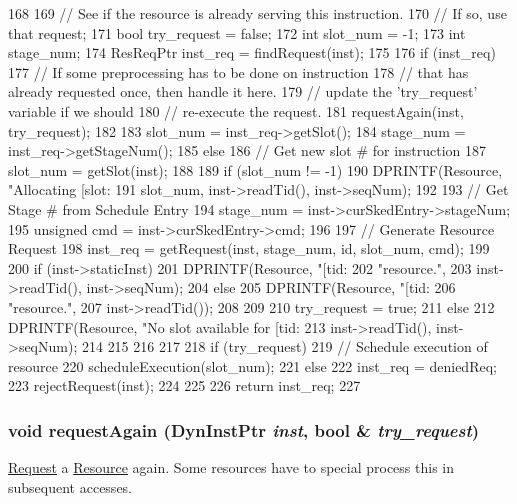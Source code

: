 \begin{DoxyCode}
168 {
169     // See if the resource is already serving this instruction.
170     // If so, use that request;
171     bool try_request = false;
172     int slot_num = -1;
173     int stage_num;
174     ResReqPtr inst_req = findRequest(inst);
175 
176     if (inst_req) {
177         // If some preprocessing has to be done on instruction
178         // that has already requested once, then handle it here.
179         // update the 'try_request' variable if we should
180         // re-execute the request.
181         requestAgain(inst, try_request);
182 
183         slot_num = inst_req->getSlot();
184         stage_num = inst_req->getStageNum();
185     } else {
186         // Get new slot # for instruction
187         slot_num = getSlot(inst);
188 
189         if (slot_num != -1) {
190             DPRINTF(Resource, "Allocating [slot:%
191                     slot_num, inst->readTid(), inst->seqNum);
192 
193             // Get Stage # from Schedule Entry
194             stage_num = inst->curSkedEntry->stageNum;
195             unsigned cmd = inst->curSkedEntry->cmd;
196 
197             // Generate Resource Request
198             inst_req = getRequest(inst, stage_num, id, slot_num, cmd);
199 
200             if (inst->staticInst) {
201                 DPRINTF(Resource, "[tid:%
202                         "resource.\n",
203                         inst->readTid(), inst->seqNum);
204             } else {
205                 DPRINTF(Resource, "[tid:%
206                         "resource.\n",
207                         inst->readTid());
208             }
209 
210             try_request = true;
211         } else {
212             DPRINTF(Resource, "No slot available for [tid:%
213                     inst->readTid(), inst->seqNum);
214         }
215 
216     }
217 
218     if (try_request) {
219         // Schedule execution of resource
220         scheduleExecution(slot_num);
221     } else {
222         inst_req = deniedReq;
223         rejectRequest(inst);
224     }
225 
226     return inst_req;
227 }
\end{DoxyCode}
\hypertarget{classResource_a9063fd6f97e36e3565247339ffa3882c}{
\subsubsection[{requestAgain}]{\setlength{\rightskip}{0pt plus 5cm}void requestAgain ({\bf DynInstPtr} {\em inst}, \/  bool \& {\em try\_\-request})}}
\label{classResource_a9063fd6f97e36e3565247339ffa3882c}
\hyperlink{classRequest}{Request} a \hyperlink{classResource}{Resource} again. Some resources have to special process this in subsequent accesses. 

